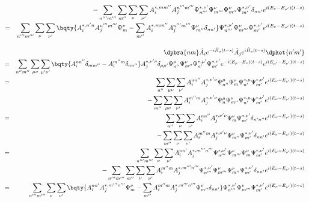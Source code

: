 \documentclass[10.5pt,a4paper]{jreport}
\begin{document}
\begin{eqnarray}
  &&- \sum_{n'''m'''}\sum_{ {m''}}\sum_{ {\nu}}\sum_{ {\nu'}}A_i^{*,  {mm''}}A_j^{ {n'''m'''}}\Psi_{n'''}^{ {*, \nu'}}\Psi_{m'''}^{ {\nu}}\Psi_{m''}^{\nu}\Psi_{m'}^{*, \nu'}\delta_{ {nn'}}e^{ {i(E_\nu- E_{\nu'})(t-s)}}\\
  \nonumber &=&\sum_{n'''m'''}\sum_{\nu}\sum_{\nu'}\bqty{A_i^{*, n'n}A_j^{n'''m'''}\Psi_{m}^{\nu} - \sum_{m''}A_i^{*, mm''}A_j^{n'''m'''}\Psi_{m''}^{\nu}\delta_{nn'}}\Psi_{n'''}^{*, \nu'}\Psi_{m'''}^{\nu}\Psi_{m'}^{*, \nu'}e^{i(E_\nu- E_{\nu'})(t-s)}\\
\end{eqnarray}

\begin{eqnarray}
  \nonumber  &&\dpbra{nm}\hat{A}_ie^{-i\hat{H}_a(t-s)}\tilde{A}_j e^{i\hat{H}_a(t-s)}\dpket{n'm'}\\
  \nonumber &=& \sum_{n''m''}\sum_{\mu\nu}\sum_{\mu'\nu'}\bqty{A_i^{ {nn''}}\delta_{mm''} - A_i^{ {m''m}}\delta_{nn''}}A_j^{ {*, \nu'\nu}}\delta_{ {\mu\mu'}}\Psi_{n''}^{\mu}\Psi_{m''}^{\nu}\Psi_{n'}^{*, \mu'}\Psi_{m'}^{*, \nu'}e^{-i(E_\mu - E_\nu)(t-s)}e^{i(E_{\mu'} - E_{\nu'})(t-s)}\\
  \nonumber &=&\sum_{n''}\sum_{\mu\nu}\sum_{ {\nu'}}A_i^{nn''}A_j^{*, \nu'\nu}\Psi_{n''}^{\mu}\Psi_{m}^{\nu}\Psi_{n'}^{*, \mu}\Psi_{m'}^{*, \nu'}e^{ {i(E_\nu- E_{\nu'})(t-s)}}\\
  &&- \sum_{m''}\sum_{\mu\nu}\sum_{ {\nu'}}A_i^{m''m}A_j^{ {*, \nu'\nu}}\Psi_{n}^{\mu}\Psi_{m''}^{\nu}\Psi_{n'}^{*, \mu}\Psi_{m'}^{*, \nu'}e^{ {i(E_\nu- E_{\nu'})(t-s)}}\\
  \nonumber &=&\sum_{n''}\sum_{ {\nu}}\sum_{ {\nu'}}A_i^{ {nn''}}A_j^{*, \nu'\nu}\Psi_{m}^{\nu}\Psi_{m'}^{*, \nu'}\delta_{ {n'n''}}e^{ {i(E_\nu- E_{\nu'})(t-s)}}\\
  &&- \sum_{m''}\sum_{ {\nu}}\sum_{ {\nu'}}A_i^{m''m}A_j^{*, \nu'\nu}\Psi_{m''}^{\nu}\Psi_{m'}^{*, \nu'}\delta_{ {nn'}}e^{ {i(E_\nu- E_{\nu'})(t-s)}}\\
  \nonumber &=&\sum_{n'''m'''}\sum_{ {\nu}}\sum_{ {\nu'}}A_i^{nn'}A_j^{*, m'''n'''}\Psi_{n'''}^{ {*, \nu'}}\Psi_{m'''}^{ {\nu}}\Psi_{m}^{ {\nu}}\Psi_{m'}^{*, \nu'}e^{ {i(E_\nu- E_{\nu'})(t-s)}}\\
  &&- \sum_{n'''m'''}\sum_{ {m''}}\sum_{ {\nu}}\sum_{ {\nu'}}A_i^{m''m}A_j^{*, m'''n'''}\Psi_{n'''}^{ {*, \nu'}}\Psi_{m'''}^{ {\nu}}\Psi_{m''}^{\nu}\Psi_{m'}^{*, \nu'}\delta_{ {nn'}}e^{ {i(E_\nu- E_{\nu'})(t-s)}}\\
  \nonumber &=&\sum_{n'''m'''}\sum_{\nu}\sum_{\nu'}\bqty{A_i^{nn'}A_j^{*, m'''n'''}\Psi_{m}^{\nu}- \sum_{m''}A_i^{m''m}A_j^{*, m'''n'''}\Psi_{m''}^{\nu}\delta_{nn'} }\Psi_{n'''}^{*, \nu'}\Psi_{m'''}^{\nu}\Psi_{m'}^{*, \nu'}e^{i(E_\nu- E_{\nu'})(t-s)}\\
\end{eqnarray}
\end{document}
